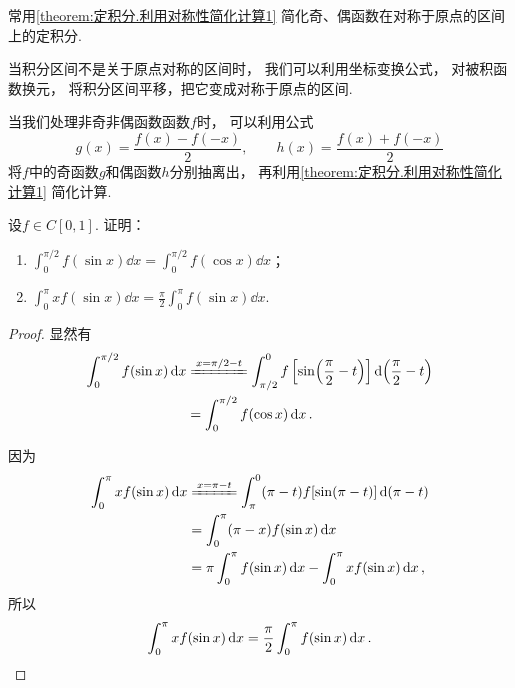 \begin{remark}
常用\cref{theorem:定积分.利用对称性简化计算1} 简化奇、偶函数在对称于原点的区间上的定积分.

当积分区间不是关于原点对称的区间时，
我们可以利用坐标变换公式，
对被积函数换元，
将积分区间平移，把它变成对称于原点的区间.

当我们处理非奇非偶函数函数\(f\)时，
可以利用公式\[
	g(x) = \frac{f(x) - f(-x)}{2}, \qquad
	h(x) = \frac{f(x) + f(-x)}{2}
\]
将\(f\)中的奇函数\(g\)和偶函数\(h\)分别抽离出，
再利用\cref{theorem:定积分.利用对称性简化计算1} 简化计算.
\end{remark}

\begin{example}
设\(f \in C[0,1]\).
证明：\begin{enumerate}
	\item \(\int_0^{\pi/2} f(\sin x) \dd{x} = \int_0^{\pi/2} f(\cos x) \dd{x}\)；
	\item \(\int_0^\pi x f(\sin x) \dd{x} = \frac{\pi}{2} \int_0^\pi f(\sin x) \dd{x}\).
\end{enumerate}
\begin{proof}
显然有\begin{align*}
	\int_0^{\pi/2} f(\sin x) \dd{x}
	&\xlongequal{x = \pi/2-t}
		\int_{\pi/2}^0 f\left[\sin(\frac{\pi}{2}-t)\right] \dd(\frac{\pi}{2}-t) \\
	&= \int_0^{\pi/2} f(\cos x) \dd{x}.
\end{align*}

因为\begin{align*}
	\int_0^\pi x f(\sin x) \dd{x}
	&\xlongequal{x = \pi-t}
		\int_{\pi}^0 (\pi-t) f[\sin(\pi-t)] \dd(\pi-t) \\
	&= \int_0^\pi (\pi-x) f(\sin x) \dd{x} \\
	&= \pi \int_0^\pi f(\sin x) \dd{x}
		- \int_0^\pi x f(\sin x) \dd{x},
\end{align*}
所以\[
	\int_0^\pi x f(\sin x) \dd{x}
	= \frac{\pi}{2} \int_0^\pi f(\sin x) \dd{x}.
	\qedhere
\]
\end{proof}
\end{example}

